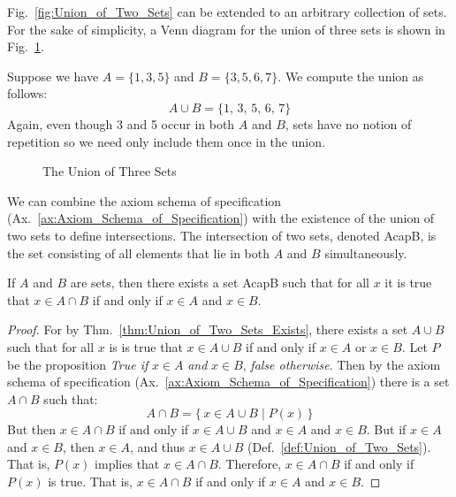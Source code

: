         Fig.~\ref{fig:Union_of_Two_Sets} can be extended to an
        arbitrary collection of sets. For the sake of simplicity, a Venn
        diagram for the union of three sets is shown in
        Fig.~\ref{fig:Union_of_Three_Sets}.
        \begin{example}
            Suppose we have $A=\{1,3,5\}$ and $B=\{3,5,6,7\}$. We compute the
            union as follows:
            \begin{equation}
                A\cup{B}=\{1,\,3,\,5,\,6,\,7\}
            \end{equation}
            Again, even though 3 and 5 occur in both $A$ and $B$, sets have no
            notion of repetition so we need only include them once in the union.
        \end{example}
        \begin{figure}[H]
            \centering
            \captionsetup{type=figure}
            
            \caption{The Union of Three Sets}
            \label{fig:Union_of_Three_Sets}
        \end{figure}
        We can combine the axiom schema of specification
        (Ax.~\ref{ax:Axiom_Schema_of_Specification}) with the existence of the
        union of two sets to define intersections. The intersection of two sets,
        denoted \gls{AcapB}, is the set consisting of all elements that lie in
        both $A$ and $B$ simultaneously.
        \begin{theorem}
            If $A$ and $B$ are sets, then there exists a set \gls{AcapB}
            such that for all $x$ it is true that $x\in{A}\cap{B}$ if and
            only if $x\in{A}$ and $x\in{B}$.
        \end{theorem}
        \begin{proof}
            For by Thm.~\ref{thm:Union_of_Two_Sets_Exists}, there exists
            a set $A\cup{B}$ such that for all $x$ is is true that
            $x\in{A}\cup{B}$ if and only if $x\in{A}$ or $x\in{B}$. Let
            $P$ be the proposition \textit{True if} $x\in{A}$ \textit{and}
            $x\in{B}$, \textit{false otherwise}. Then by the axiom schema
            of specification (Ax.~\ref{ax:Axiom_Schema_of_Specification})
            there is a set $A\cap{B}$ such that:
            \begin{equation}
                A\cap{B}=\big\{\,x\in{A}\cup{B}\;|\;P(x)\,\big\}
            \end{equation}
            But then $x\in{A}\cap{B}$ if and only if $x\in{A}\cup{B}$ and
            $x\in{A}$ and $x\in{B}$. But if $x\in{A}$ and $x\in{B}$, then
            $x\in{A}$, and thus $x\in{A}\cup{B}$
            (Def.~\ref{def:Union_of_Two_Sets}). That is, $P(x)$ implies that
            $x\in{A}\cap{B}$. Therefore, $x\in{A}\cap{B}$ if and only if $P(x)$
            is true. That is, $x\in{A}\cap{B}$ if and only if $x\in{A}$ and
            $x\in{B}$.
        \end{proof}
